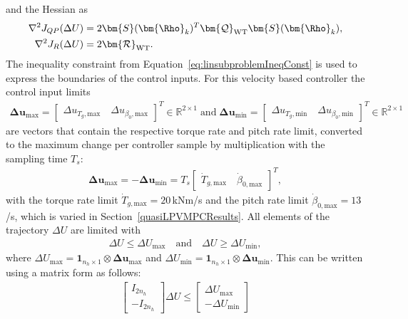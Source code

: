 and the Hessian as
\begin{align*}
    \nabla^2 J_{QP}(\Delta U) &= 2\bm{S}(\bm{\Rho}_k)^T \bm{\mathcal{Q}}_{\text{WT}} \bm{S}(\bm{\Rho}_k),\\
    \nabla^2 J_R(\Delta U) &= 2 \bm{\mathcal{R}}_{\text{WT}}.
\end{align*}
The inequality constraint from Equation~\eqref{eq:linsubproblemIneqConst} is used to express the boundaries of the control inputs. For this velocity based controller the control input limits 
\begin{align*}
   \bm{\Delta u}_{\text{max}} = \begin{bmatrix} \Delta u_{T_g, \text{max}} \quad \Delta u_{\beta_0, \text{max}} \end{bmatrix}^T \in \mathbb{R}^{2 \times 1} \; \text{and}\; 
    \bm{\Delta u}_{\text{min}} = \begin{bmatrix} \Delta u_{T_g, \text{min}} \quad \Delta u_{\beta_0, \text{min}} \end{bmatrix}^T \in \mathbb{R}^{2 \times 1}
\end{align*}
are vectors that contain the respective torque rate and pitch rate limit, converted to the maximum change per controller sample by multiplication with the sampling time $T_s$:
\begin{align*}
   \bm{\Delta u}_{\text{max}} = -\bm{\Delta u}_{\text{min}} = T_s \begin{bmatrix} \dot{T}_{g, \text{max}} \quad \dot{\beta}_{0, \text{max}} \end{bmatrix}^T,
\end{align*}
with the torque rate limit $\dot{T}_{g, \text{max}} = 20$\,kNm/s and the pitch rate limit $\dot{\beta}_{0, \text{max}} = 13$\textdegree/s, which is varied in Section~\ref{quasiLPVMPCResults}. All elements of the trajectory $\Delta U$ are limited with
\begin{align*}
    \Delta U \leq \Delta U_{\text{max}} \quad \text{and} \quad \Delta U \geq \Delta U_{\text{min}},
\end{align*}
where $ \Delta U_{\text{max}} = \bm{1}_{n_h \times 1}\otimes \bm{\Delta u}_{\text{max}}$  and $ \Delta U_{\text{min}} = \bm{1}_{n_h \times 1}\otimes \bm{\Delta u}_{\text{min}}$.
%
This can be written using a matrix form as follows:
\begin{align*}
    \begin{bmatrix}
        I_{2 n_h} \\
        -I_{2 n_h}
    \end{bmatrix} \Delta U \leq
    \begin{bmatrix}
        \Delta U_{\text{max}} \\
        -\Delta U_{\text{min}}\end{bmatrix}
\end{align*}
